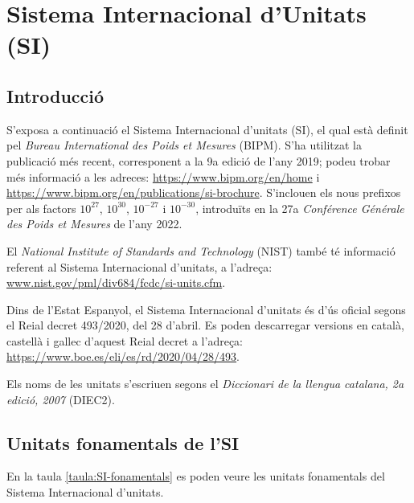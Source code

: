 \chapter{Sistema Internacional d'Unitats (SI)}\label{sec:SI}

\section{Introducció}\label{sec:SI-intro}
S'exposa a continuació el Sistema
Internacional d'unitats (SI), el qual està definit pel  \textit{Bureau
International des Poids et Mesures} (BIPM). S'ha utilitzat la publicació més recent, corresponent a la 9a edició de l'any 2019; podeu trobar més informació a les adreces: \href{https://www.bipm.org/en/home/}{https://www.bipm.org/en/home} i \href{https://www.bipm.org/en/publications/si-brochure/}{https://www.bipm.org/en/publications/si-brochure}. S'inclouen els nous prefixos per als factors $10^{27}$,  $10^{30}$,  $10^{-27}$ i  $10^{-30}$, introduïts en la 27a \textit{Conférence Générale des Poids et Mesures} de l'any 2022. 

El  \textit{National Institute of Standards and Technology} (NIST) també té informació referent al Sistema
Internacional d'unitats, a l'adreça: \href{http://www.nist.gov/pml/div684/fcdc/si-units.cfm}
{www.nist.gov/pml/div684/fcdc/si-units.cfm}.

Dins de l'Estat Espanyol, el Sistema Internacional d'unitats és d'ús oficial segons el Reial decret 493/2020, del 28 d'abril. Es poden descarregar versions en català, castellà i gallec d'aquest Reial decret a l'adreça: \href{https://www.boe.es/eli/es/rd/2020/04/28/493}
{https://www.boe.es/eli/es/rd/2020/04/28/493}.

Els noms de les unitats s'escriuen segons el  \textit{Diccionari de la llengua catalana, 2a edició, 2007} (DIEC2).

\section{Unitats fonamentals de l'SI}

En la taula \vref{taula:SI-fonamentals} es poden veure les unitats
fonamentals del Sistema Internacional d'unitats.

